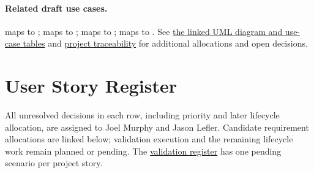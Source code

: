 \paragraph{Related draft use cases.}
 maps to ;
 maps to ;
 maps to ;
 maps to .
See \hyperref[Figure:UseCaseDiagram]{the linked UML diagram and use-case tables}
and \hyperref[Section:DraftStoryTraceability]{project traceability} for
additional allocations and open decisions.

\section{User Story Register}
\label{Section:ProjectUserStoryRegister}
All unresolved decisions in each row, including priority and later lifecycle allocation, are assigned to
Joel Murphy and Jason Lefler. Candidate requirement allocations are linked below; validation
execution and the remaining lifecycle work remain planned or pending.
The \hyperref[Table:ValidationRegister]{validation register} has one pending
scenario per project story.

